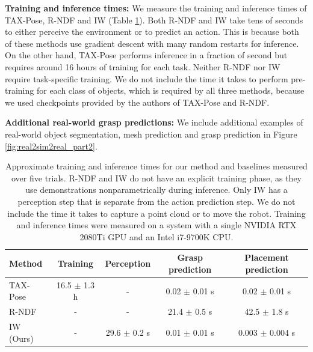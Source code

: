 \documentclass{article}
\begin{document}
\textbf{Training and inference times:} We measure the training and inference times of TAX-Pose, R-NDF and IW (Table \ref{tab:time}). Both R-NDF and IW take tens of seconds to either perceive the environment or to predict an action. This is because both of these methods use gradient descent with many random restarts for inference. On the other hand, TAX-Pose performs inference in a fraction of second but requires around 16 hours of training for each task. Neither R-NDF nor IW require task-specific training. We do not include the time it takes to perform pre-training for each class of objects, which is required by all three methods, because we used checkpoints provided by the authors of TAX-Pose and R-NDF.

\textbf{Additional real-world grasp predictions:} We include additional examples of real-world object segmentation, mesh prediction and grasp prediction in Figure \ref{fig:real2sim2real_part2}.

\begin{table}
    \centering
    \begin{tabular}{lcccc}
        \toprule
        Method & Training & Perception & Grasp prediction & Placement prediction \\
        \midrule
        TAX-Pose \cite{pan22taxpose} & 16.5 $\pm$ 1.3 h & - & 0.02 $\pm$ 0.01 s & 0.02 $\pm$ 0.01 s\\
        R-NDF \cite{simeonov22se} & - & - & 21.4 $\pm$ 0.5 s & 42.5 $\pm$ 1.8 s \\
        IW (Ours) & - & 29.6 $\pm$ 0.2 s & 0.01 $\pm$ 0.01 s & 0.003 $\pm$ 0.004 s \\
        \bottomrule
    \end{tabular}
    \vspace{0.5em}
    \caption{Approximate training and inference times for our method and baselines measured over five trials. R-NDF and IW do not have an explicit training phase, as they use demonstrations nonparametrically during inference. Only IW has a perception step that is separate from the action prediction step. We do not include the time it takes to capture a point cloud or to move the robot. Training and inference times were measured on a system with a single NVIDIA RTX 2080Ti GPU and an Intel i7-9700K CPU.}
    \label{tab:time}
\end{table}
\end{document}
